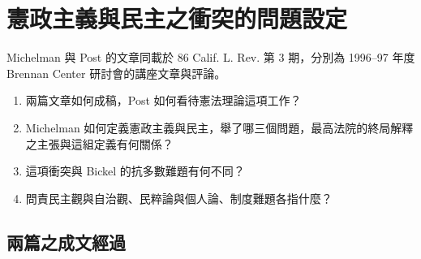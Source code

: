 \chapter{憲政主義與民主之衝突的問題設定}
\label{ch:10_problem}

\begin{qaquestion}
Michelman 與 Post 的文章同載於 86 Calif. L. Rev. 第 3 期，分別為 1996--97 年度 Brennan Center 研討會的講座文章與評論。
\begin{enumerate}
\tightlist
\item 兩篇文章如何成稿，Post 如何看待憲法理論這項工作？
\item Michelman 如何定義憲政主義與民主，舉了哪三個問題，最高法院的終局解釋之主張與這組定義有何關係？
\item 這項衝突與 Bickel 的抗多數難題有何不同？
\item 問責民主觀與自治觀、民粹論與個人論、制度難題各指什麼？
\end{enumerate}
\end{qaquestion}

\section{兩篇之成文經過}
\label{sec:10_problem-1}

